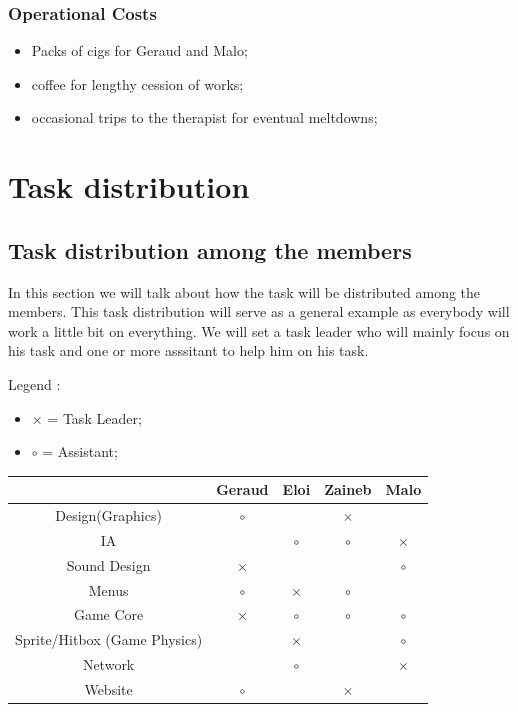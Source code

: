 \documentclass[a4paper, 11pt] {article}
\begin{document}
\subsubsection{Operational Costs}

\begin{itemize}
    \item Packs of cigs for Geraud and Malo;
    \item coffee for lengthy cession of works;
    \item occasional trips to the therapist for eventual meltdowns;
\end{itemize}\par












\newpage
\section{Task distribution}

\subsection{Task distribution among the members}

\par
In this section we will talk about how the task will be distributed among the members. This task distribution 
will serve as a general example as everybody will work a little bit on everything. We will set a task leader who will mainly focus 
on his task and one or more asssitant to help him on his task.
\newline

\par
Legend :
\begin{itemize}
    \item $\times$ = Task Leader;
    \item $\circ$ = Assistant;
\end{itemize}

\begin{center}
\begin{tabular}{|c|c|c|c|c|}
    \hline & Geraud & Eloi & Zaineb & Malo \\
    \hline Design(Graphics) & $\circ$ & & $\times$  & \\
    \hline IA & & $\circ$ & $\circ$ & $\times$ \\
    \hline Sound Design & $\times$ & & & $\circ$ \\
    \hline Menus & $\circ$ & $\times$ & $\circ$ & \\
    \hline Game Core & $\times$ & $\circ$ & $\circ$ & $\circ$ \\
    \hline Sprite/Hitbox (Game Physics) & & $\times$ & & $\circ$ \\
    \hline Network & & $\circ$ & & $\times$ \\
    \hline Website & $\circ$ & & $\times$ & \\
    \hline
\end{tabular}
\end{center}
\end{document}
